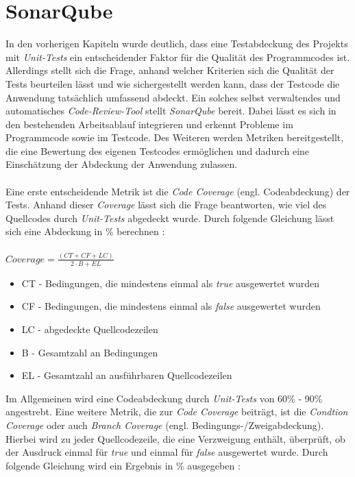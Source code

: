 \section{SonarQube}
In den vorherigen Kapiteln wurde deutlich, dass eine Testabdeckung des Projekts mit \textit{Unit-Tests} ein entscheidender Faktor für die Qualität des Programmcodes ist. Allerdings stellt sich die Frage, anhand welcher Kriterien sich die Qualität der Tests beurteilen lässt und wie sichergestellt werden kann, dass der Testcode die Anwendung tatsächlich umfassend abdeckt. Ein solches selbst verwaltendes und automatisches \textit{Code-Review-Tool} stellt \textit{SonarQube} bereit. Dabei lässt es sich in den bestehenden Arbeitsablauf integrieren und erkennt Probleme im Programmcode sowie im Testcode. \cite*{SonarQube10} Des Weiteren werden Metriken bereitgestellt, die eine Bewertung des eigenen Testcodes ermöglichen und dadurch eine Einschätzung der Abdeckung der Anwendung zulassen.\\\\
Eine erste entscheidende Metrik ist die \textit{Code Coverage} (engl. Codeabdeckung) der Tests. Anhand dieser \textit{Coverage} lässt sich die Frage beantworten, wie viel des Quellcodes durch \textit{Unit-Tests} abgedeckt wurde. Durch folgende Gleichung lässt sich eine Abdeckung in \% berechnen \cite*{MetricDefinition}:\\\\
$Coverage = \frac{(CT + CF + LC)}{2 \cdot B + EL}$
\begin{itemize}
    \setlength{\parskip}{1pt}
    \item CT - Bedingungen, die mindestens einmal als \textit{true} ausgewertet wurden
    \item CF - Bedingungen, die mindestens einmal als \textit{false} ausgewertet wurden
    \item LC - abgedeckte Quellcodezeilen
    \item B - Gesamtzahl an Bedingungen
    \item EL - Gesamtzahl an ausführbaren Quellcodezeilen
\end{itemize}
Im Allgemeinen wird eine Codeabdeckung durch \textit{Unit-Tests} von 60\% - 90\% angestrebt. \cite*{WhatReasonableCode}
Eine weitere Metrik, die zur \textit{Code Coverage} beiträgt, ist die \textit{Condtion Coverage} oder auch \textit{Branch Coverage} (engl. Bedingungs-/Zweigabdeckung). Hierbei wird zu jeder Quellcodezeile, die eine Verzweigung enthält, überprüft, ob der Ausdruck einmal für \textit{true} und einmal für \textit{false} ausgewertet wurde. Durch folgende Gleichung wird ein Ergebnis in \% ausgegeben \cite*{MetricDefinition}:\\\\
